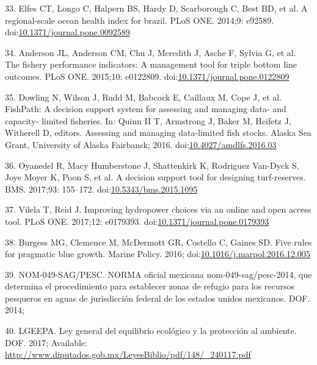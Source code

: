 \documentclass[12pt,]{article}
\begin{document}
\hypertarget{ref-elfes_2014-RC}{}
33. Elfes CT, Longo C, Halpern BS, Hardy D, Scarborough C, Best BD, et
al. A regional-scale ocean health index for brazil. PLoS ONE. 2014;9:
e92589.
doi:\href{https://doi.org/10.1371/journal.pone.0092589}{10.1371/journal.pone.0092589}

\hypertarget{ref-anderson_2015-ND}{}
34. Anderson JL, Anderson CM, Chu J, Meredith J, Asche F, Sylvia G, et
al. The fishery performance indicators: A management tool for triple
bottom line outcomes. PLoS ONE. 2015;10: e0122809.
doi:\href{https://doi.org/10.1371/journal.pone.0122809}{10.1371/journal.pone.0122809}

\hypertarget{ref-dowling_2016-pO}{}
35. Dowling N, Wilson J, Rudd M, Babcock E, Caillaux M, Cope J, et al.
FishPath: A decision support system for assessing and managing data- and
capacity- limited fisheries. In: Quinn II T, Armstrong J, Baker M,
Heifetz J, Witherell D, editors. Assessing and managing data-limited
fish stocks. Alaska Sea Grant, University of Alaska Fairbansk; 2016.
doi:\href{https://doi.org/10.4027/amdlfs.2016.03}{10.4027/amdlfs.2016.03}

\hypertarget{ref-oyanedel_2017-TO}{}
36. Oyanedel R, Macy Humberstone J, Shattenkirk K, Rodriguez Van-Dyck S,
Joye Moyer K, Poon S, et al. A decision support tool for designing
turf-reserves. BMS. 2017;93: 155--172.
doi:\href{https://doi.org/10.5343/bms.2015.1095}{10.5343/bms.2015.1095}

\hypertarget{ref-vilela_2017-Zo}{}
37. Vilela T, Reid J. Improving hydropower choices via an online and
open access tool. PLoS ONE. 2017;12: e0179393.
doi:\href{https://doi.org/10.1371/journal.pone.0179393}{10.1371/journal.pone.0179393}

\hypertarget{ref-burgess_2016-HN}{}
38. Burgess MG, Clemence M, McDermott GR, Costello C, Gaines SD. Five
rules for pragmatic blue growth. Marine Policy. 2016;
doi:\href{https://doi.org/10.1016/j.marpol.2016.12.005}{10.1016/j.marpol.2016.12.005}

\hypertarget{ref-nom049sagpesc_2014-V6}{}
39. NOM-049-SAG/PESC. NORMA oficial mexicana nom-049-sag/pesc-2014, que
determina el procedimiento para establecer zonas de refugio para los
recursos pesqueros en aguas de jurisdicción federal de los estados
unidos mexicanos. DOF. 2014;

\hypertarget{ref-lgeepa_2017-jL}{}
40. LGEEPA. Ley general del equilibrio ecológico y la protección al
ambiente. DOF. 2017; Available:
\url{http://www.diputados.gob.mx/LeyesBiblio/pdf/148/_240117.pdf}
\end{document}
